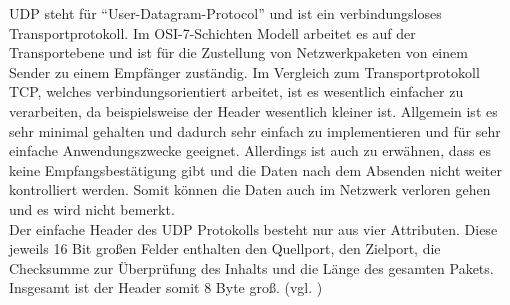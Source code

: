 UDP steht für ``User-Datagram-Protocol'' und ist ein verbindungsloses Transportprotokoll. Im \ac{OSI}-7-Schichten Modell arbeitet es auf der Transportebene und ist für die Zustellung von Netzwerkpaketen von einem Sender zu einem Empfänger zuständig. Im Vergleich zum Transportprotokoll \ac{TCP}, welches verbindungsorientiert arbeitet, ist es wesentlich einfacher zu verarbeiten, da beispielsweise der Header wesentlich kleiner ist. Allgemein ist es sehr minimal gehalten und dadurch sehr einfach zu implementieren und für sehr einfache Anwendungszwecke geeignet. Allerdings ist auch zu erwähnen, dass es keine Empfangsbestätigung gibt und die Daten nach dem Absenden nicht weiter kontrolliert werden. Somit können die Daten auch im Netzwerk verloren gehen und es wird nicht bemerkt. \\

Der einfache Header des \ac{UDP} Protokolls besteht nur aus vier Attributen. Diese jeweils 16 Bit großen Felder enthalten den Quellport, den Zielport, die Checksumme zur Überprüfung des Inhalts und die Länge des gesamten Pakets. Insgesamt ist der Header somit 8 Byte groß. (vgl. \cite{ElektronikKompendium.}\cite{.}\cite{.23.02.2016})
 